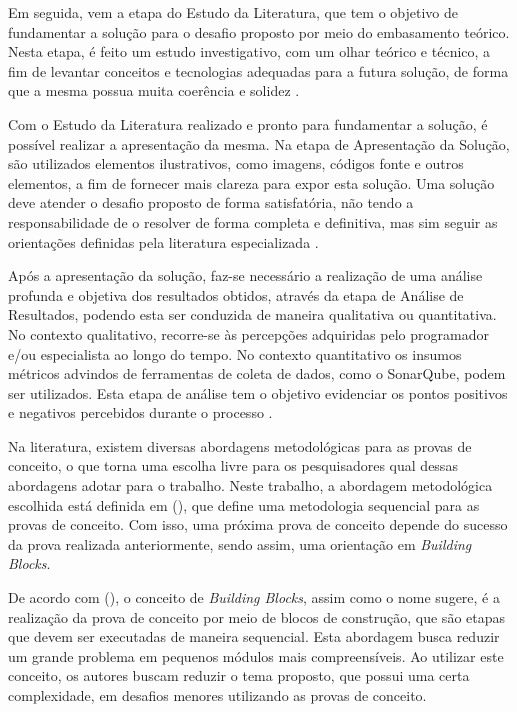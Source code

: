 Em seguida, vem a etapa do Estudo da Literatura, que tem o objetivo de fundamentar a solução para 
o desafio proposto por meio do embasamento teórico. Nesta etapa, é feito um estudo investigativo, 
com um olhar teórico e técnico, a fim de levantar conceitos e tecnologias adequadas para a futura 
solução, de forma que a mesma possua muita coerência e solidez \cite{silva2023microfrontends}.

Com o Estudo da Literatura realizado e pronto para fundamentar a solução, é possível realizar a 
apresentação da mesma. Na etapa de Apresentação da Solução, são utilizados elementos ilustrativos, 
como imagens, códigos fonte e outros elementos, a fim de fornecer mais clareza para expor esta 
solução. Uma solução deve atender o desafio proposto de forma satisfatória, não tendo a responsabilidade 
de o resolver de forma completa e definitiva, mas sim seguir as orientações definidas pela literatura 
especializada \cite{silva2023microfrontends}.

Após a apresentação da solução, faz-se necessário a realização de uma análise profunda e objetiva dos 
resultados obtidos, através da etapa de Análise de Resultados, podendo esta ser conduzida de maneira 
qualitativa ou quantitativa. No contexto qualitativo, recorre-se às percepções adquiridas pelo programador 
e/ou especialista ao longo do tempo. No contexto quantitativo os insumos métricos advindos de ferramentas 
de coleta de dados, como o SonarQube, podem ser utilizados. Esta etapa de análise tem o objetivo evidenciar 
os pontos positivos e negativos percebidos durante o processo \cite{silva2023microfrontends}.

Na literatura, existem diversas abordagens metodológicas para as provas de conceito, o que torna uma 
escolha livre para os pesquisadores qual dessas abordagens adotar para o trabalho. Neste trabalho, a 
abordagem metodológica escolhida está definida em  (\citeyear{turilli2016designing}), 
que define uma metodologia sequencial 
para as provas de conceito. Com isso, uma próxima prova de conceito depende do sucesso da prova realizada 
anteriormente, sendo assim, uma orientação em \textit{Building Blocks}.

De acordo com  (\citeyear{turilli2016designing}), o 
conceito de \textit{Building Blocks}, assim como o nome sugere, é a 
realização da prova de conceito por meio de blocos de construção, que são etapas que devem ser executadas 
de maneira sequencial. Esta abordagem busca reduzir um grande problema em pequenos módulos mais 
compreensíveis. Ao utilizar este conceito, os autores buscam reduzir o tema proposto, que possui uma 
certa complexidade, em desafios menores utilizando as provas de conceito.

